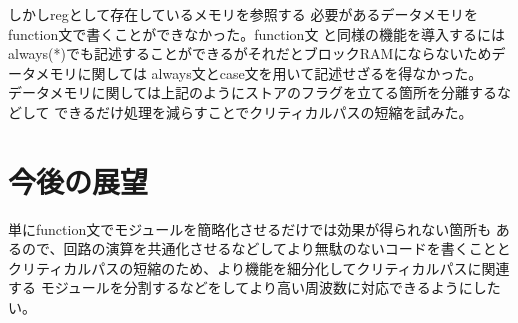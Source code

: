 \documentclass[12pt]{jreport}
\begin{document}
  
  しかしregとして存在しているメモリを参照する
  必要があるデータメモリをfunction文で書くことができなかった。function文
  と同様の機能を導入するにはalways(*)でも記述することができるがそれだとブロックRAMにならないためデータメモリに関しては
  always文とcase文を用いて記述せざるを得なかった。\\
  データメモリに関しては上記のようにストアのフラグを立てる箇所を分離するなどして
  できるだけ処理を減らすことでクリティカルパスの短縮を試みた。
  
  
  \section{今後の展望}
  単にfunction文でモジュールを簡略化させるだけでは効果が得られない箇所も
  あるので、回路の演算を共通化させるなどしてより無駄のないコードを書くことと
  クリティカルパスの短縮のため、より機能を細分化してクリティカルパスに関連する
  モジュールを分割するなどをしてより高い周波数に対応できるようにしたい。

  




 

  
  
\end{document}
